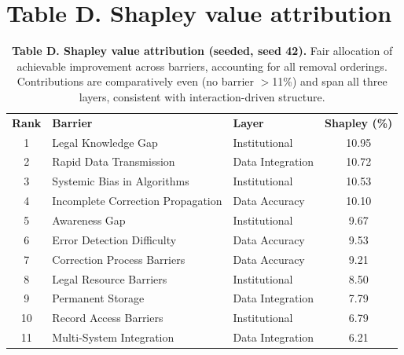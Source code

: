 \documentclass[10pt,letterpaper]{article}
\newlength\savedwidth
\newcommand\thickhline{\noalign{\global\savedwidth\arrayrulewidth\global\arrayrulewidth 2pt}\hline\noalign{\global\arrayrulewidth\savedwidth}}
\begin{document}
\section*{Table D. Shapley value attribution}
\begin{table}[!ht]\centering
\caption{{\bf Table D. Shapley value attribution (seeded, seed 42).} Fair allocation of achievable improvement across barriers, accounting for all removal orderings. Contributions are comparatively even (no barrier $>$11\%) and span all three layers, consistent with interaction-driven structure.}
\label{S4}
\begin{tabular}{c l l c}
\hline \textbf{Rank} & \textbf{Barrier} & \textbf{Layer} & \textbf{Shapley (\%)} \\ \thickhline
1 & Legal Knowledge Gap & Institutional & 10.95 \\
2 & Rapid Data Transmission & Data Integration & 10.72 \\
3 & Systemic Bias in Algorithms & Institutional & 10.53 \\
4 & Incomplete Correction Propagation & Data Accuracy & 10.10 \\
5 & Awareness Gap & Institutional & 9.67 \\
6 & Error Detection Difficulty & Data Accuracy & 9.53 \\
7 & Correction Process Barriers & Data Accuracy & 9.21 \\
8 & Legal Resource Barriers & Institutional & 8.50 \\
9 & Permanent Storage & Data Integration & 7.79 \\
10 & Record Access Barriers & Institutional & 6.79 \\
11 & Multi-System Integration & Data Integration & 6.21 \\ \hline
\end{tabular}
\end{table}

\end{document}
